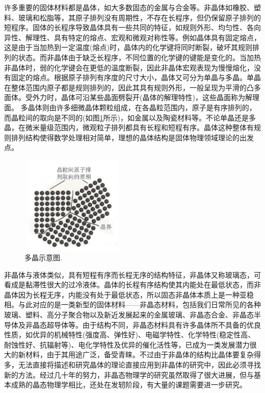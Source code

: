 许多重要的固体材料都是晶体，如大多数固态的金属与合金等。非晶体如橡胶、塑料、玻璃和松脂等，其原子排列没有周期性，不存在长程序，但仍保留原子排列的短程序。固体的长程序导致晶体具有一些共同的特征，如规则外形、均匀性、各向异性、解理性、具有特定的熔点、宏观和微观对称性等。例如晶体具有固定熔点，这是由于当加热到一定温度(熔点)时，晶体内的化学键将同时断裂，破坏其规则排列的状态。而非晶体由于缺乏长程序，不同位置的化学键的键能是变化的。当加热非晶体时，弱的化学键会在更低的温度断裂，因此非晶体宏观表现为慢慢熔化，没有固定的熔点。根据原子排列有序度的尺寸大小，晶体又可分为单晶与多晶。单晶在整体范围内原子都是规则排列的，因此其具有规则外形，一般呈现为平滑的凸多面体。受外力时，晶体可沿某些晶面劈裂开(晶体的解理特性)，这些晶面称为解理面。%
多晶体则由许多细微晶体颗粒组成，在各晶粒范围内，原子是有序排列的，而晶粒间的取向是不同的(如图\ref{Fig:SSI-02}所示)，如金属以及陶瓷材料等。不论单晶还是多晶，在微米量级范围内，微观粒子排列都具有长程和短程有序。晶体这种整体有规则排列结构使得数学处理相对简单，理想的晶体结构是固体物理领域理论的出发点。
\begin{figure}[h!]
\centering
\vspace*{-0.18in}
\includegraphics[height=1.85in,width=2.0in,viewport=0 0 45 40,clip]{Figures/Polycrystal.png}
\caption{\small \textrm{多晶示意图. }}%
\label{Fig:SSI-02}
\end{figure}

非晶体与液体类似，具有短程有序而长程无序的结构特征，非晶体又称玻璃态，可看成是黏滞性很大的过冷液体。晶体的长程有序结构使其内能处在最低状态，而非晶体因为长程无序，内能没有处于最低状态，所以固态非晶体本质上是一种亚稳相。与此对应的是一类新型的固体材料——非晶态材料，包括我们日常所见的各种玻璃、塑料、高分子聚合物以及新近发展起来的金属玻璃、非晶态合金、非晶态半导体及非晶态超导体等。由于结构不同，非晶态材料具有许多晶体所不具备的优良性质，如优异的机械特性(强度高、弹性好)、电磁学特性、化学特性(稳定性高、耐蚀性好、抗辐射等)、电化学特性及优异的催化活性等，已成为一类发展潜力很大的新材料，由于其用途广泛，备受青睐。不过由于非晶体的结构比晶体要复杂得多，无法直接将描述和研究晶体的理论直接应用到非晶体的研究中，因此必须寻找新的方法。经过几十年的努力，非晶态物理学的研究虽然取得了很大进展，但与基本成熟的晶态物理学相比，还处在发轫阶段，有大量的课题需要进一步研究。


